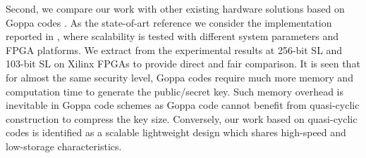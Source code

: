 \documentclass[preprint]{iacrtrans}
\begin{document}
\begin{table}[!t]\centering
\caption{Performance comparison of our FPGA implementation with other code-based key generators.}
\label{table:compare}
\begin{minipage}{\textwidth}\centering
{}
\end{minipage}
\end{table}

Second, we compare our work with other existing hardware solutions based on Goppa codes \cite{wang2018fpga,shoufan2010novel}. As the state-of-art reference we consider the implementation reported in \cite{wang2018fpga}, where scalability is tested with different system parameters and FPGA platforms. We extract from \cite{wang2018fpga} the experimental results at 256-bit SL and 103-bit SL on Xilinx FPGAs to provide direct and fair comparison.
It is seen that for almost the same security level, Goppa codes require much more memory and computation time to generate the public/secret key. Such memory overhead is inevitable in Goppa code schemes as Goppa code cannot benefit from quasi-cyclic construction to compress the key size.
Conversely, our work based on quasi-cyclic codes is identified as a scalable lightweight design which shares high-speed and low-storage characteristics.
\end{document}
